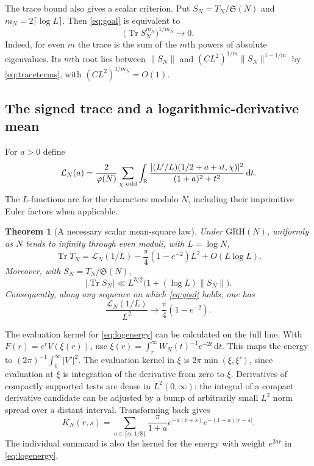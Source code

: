 \documentclass[11pt,a4paper]{article}
\numberwithin{equation}{section}
\newtheorem{theorem}{Theorem}[section]
\newcommand{\SSS}{\mathfrak S}
\newcommand{\grh}{\mathrm{GRH}}
\newcommand{\ud}{\mathrm d}
\begin{document}
The trace bound also gives a scalar criterion. Put
$S_N=T_N/\SSS(N)$ and $m_N=2\lceil\log L\rceil$.
Then \cref{eq:goal} is equivalent to
\begin{equation}
       \bigl(\operatorname{Tr} S_N^{m_N}\bigr)^{1/m_N}
              \longrightarrow 0.
 \label{eq:tracemoment}
\end{equation}
Indeed, for even $m$ the trace is the sum of the $m$th
powers of absolute eigenvalues. Its $m$th root lies between
$\|S_N\|$ and $(C L^2)^{1/m}\|S_N\|^{1-1/m}$ by
\cref{eq:traceterms}, with $(C L^2)^{1/m_N}=O(1)$.

\subsection{The signed trace and a logarithmic-derivative mean}

For $a>0$ define
\[
 \mathcal L_N(a)=\frac2{\varphi(N)}
    \sum_{\chi\ {\rm odd}}\int_{\mathbb R}
       \frac{|(L'/L)(1/2+a+it,\chi)|^2}{(1+a)^2+t^2}\,\ud t .
\]
The $L$-functions are for the characters modulo $N$, including
their imprimitive Euler factors when applicable.

\begin{theorem}[A necessary scalar mean-square law]
\label{thm:signedtrace}
Under $\grh(N)$, uniformly as $N$ tends to infinity through
even moduli, with $L=\log N$,
\begin{equation}
 \operatorname{Tr} T_N
   =\mathcal L_N(1/L)-\frac{\pi}{4}(1-e^{-2})L^2+O(L\log L).
 \label{eq:signedtrace}
\end{equation}
Moreover, with $S_N=T_N/\SSS(N)$,
\begin{equation}
 |\operatorname{Tr} S_N|
    \ll L^{3/2}\bigl(1+(\log L)\|S_N\|\bigr).
 \label{eq:signedtracenorm}
\end{equation}
Consequently, along any sequence on which
\cref{eq:goal} holds, one has
\begin{equation}
 \frac{\mathcal L_N(1/L)}{L^2}\longrightarrow
               \frac{\pi}{4}(1-e^{-2}).
 \label{eq:necessaryderivativelaw}
\end{equation}
\end{theorem}

The evaluation kernel for \cref{eq:logenergy} can be calculated
on the full line. With $F(r)=e^r V(\xi(r))$, use
$\xi(r)=\int_r^\infty W_N(t)^{-1}e^{-2t}\,\ud t$.
This maps the energy to $(2\pi)^{-1}\int_0^\infty|V'|^2$.
The evaluation kernel in $\xi$ is $2\pi\min(\xi,\xi')$,
since evaluation at $\xi$ is integration of the derivative
from zero to $\xi$. Derivatives of compactly supported tests
are dense in $L^2(0,\infty)$: the integral of a compact
derivative candidate can be adjusted by a bump of arbitrarily
small $L^2$ norm spread over a distant interval.
Transforming back gives
\begin{equation}
 K_N(r,s)=
 \sum_{a\in\{\alpha,1/8\}}\frac{\pi}{1+a}
               e^{-a(r+s)} e^{-(1+a)|r-s|}.
 \label{eq:fullenergykernel}
\end{equation}
The individual summand is also the kernel for the energy
with weight $e^{2ar}$ in \cref{eq:logenergy}.
\end{document}
